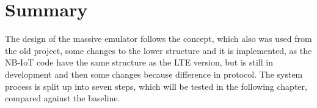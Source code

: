 \section{Summary}
The design of the massive emulator follows the concept, which also was used from the old project, some changes to the lower structure and it is implemented, as the NB-IoT code have the same structure as the LTE version, but is still in development and then some changes because difference in protocol. The system process is split up into seven steps, which will be tested in the following chapter, compared against the baseline.

